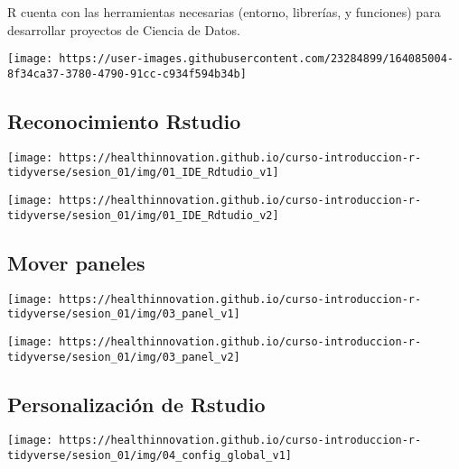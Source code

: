 \documentclass[
]{book}
\begin{document}
R cuenta con las herramientas necesarias (entorno, librerías, y funciones) para desarrollar proyectos de Ciencia de Datos.

\begin{center}\texttt{[image: https://user-images.githubusercontent.com/23284899/164085004-8f34ca37-3780-4790-91cc-c934f594b34b]} \end{center}

\hypertarget{reconocimiento-rstudio}{%
\subsection{Reconocimiento Rstudio}\label{reconocimiento-rstudio}}

\begin{center}\texttt{[image: https://healthinnovation.github.io/curso-introduccion-r-tidyverse/sesion\_01/img/01\_IDE\_Rdtudio\_v1]} \end{center}

\begin{center}\texttt{[image: https://healthinnovation.github.io/curso-introduccion-r-tidyverse/sesion\_01/img/01\_IDE\_Rdtudio\_v2]} \end{center}

\hypertarget{mover-paneles}{%
\subsection{Mover paneles}\label{mover-paneles}}

\begin{center}\texttt{[image: https://healthinnovation.github.io/curso-introduccion-r-tidyverse/sesion\_01/img/03\_panel\_v1]} \end{center}

\begin{center}\texttt{[image: https://healthinnovation.github.io/curso-introduccion-r-tidyverse/sesion\_01/img/03\_panel\_v2]} \end{center}

\hypertarget{personalizaciuxf3n-de-rstudio}{%
\subsection{Personalización de Rstudio}\label{personalizaciuxf3n-de-rstudio}}

\begin{center}\texttt{[image: https://healthinnovation.github.io/curso-introduccion-r-tidyverse/sesion\_01/img/04\_config\_global\_v1]} \end{center}
\end{document}
